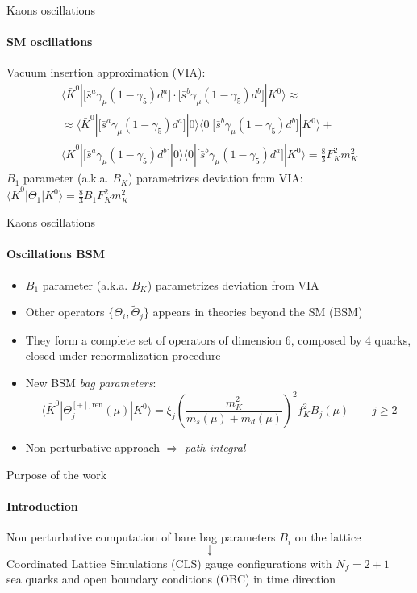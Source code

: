 \documentclass{beamer}
\newcommand{\la}{\langle}
\newcommand{\ra}{\rangle}
\begin{document}
\begin{frame}{Kaons oscillations}
      \framesubtitle{SM oscillations}
      Vacuum insertion approximation (VIA):
      \begin{equation*}
            \begin{gathered}
                  \la \bar K^0 | \Big[ \bar s^a \gamma_\mu (1-\gamma_5) d^a \Big] \cdot \Big[ \bar s^b \gamma_\mu (1-\gamma_5) d^b \Big] | K^0 \ra \approx \\
                  \approx \la \bar K^0 | \Big[ \bar s^a \gamma_\mu (1-\gamma_5) d^a \Big] | 0 \ra \la 0 | \Big[ \bar s^b \gamma_\mu (1-\gamma_5) d^b \Big] | K^0 \ra + \\
                  \la \bar K^0 | \Big[ \bar s^a \gamma_\mu (1-\gamma_5) d^b \Big] | 0 \ra \la 0 | \Big[ \bar s^b \gamma_\mu (1-\gamma_5) d^a \Big] | K^0 \ra = \frac{8}{3} F_K^2 m_K^2
            \end{gathered}
      \end{equation*}
      $B_1$ parameter (a.k.a. $B_K$) parametrizes deviation from VIA: $\la \bar K^0 | \Theta_1 | K^0 \ra = \frac{8}{3} B_1 F_K^2 m_K^2$
\end{frame}

\begin{frame}[fragile]{Kaons oscillations}
      \framesubtitle{Oscillations BSM}
      \begin{itemize}
            \item $B_1$ parameter (a.k.a. $B_K$) parametrizes deviation from VIA
            \item Other operators $\{\Theta_i,\tilde\Theta_j\}$ appears in theories beyond the SM (BSM)
            \item They form a complete set of operators of dimension 6, composed by 4 quarks, closed under renormalization procedure
            \item New BSM \emph{bag parameters}:
            \begin{equation*}
                  \la \bar K^0 | \Theta_j^{[+],\text{ren}} (\mu) | K^0 \ra = \xi_j \left(\frac{m_K^2}{m_s(\mu)+m_d(\mu)}\right)^2 f_K^2 B_j(\mu) \qquad j \ge 2
            \end{equation*}
            \item Non perturbative approach $\Longrightarrow$ \emph{path integral}
      \end{itemize}
\end{frame}

\begin{frame}{Purpose of the work}
      \framesubtitle{Introduction}
      \centering
      Non perturbative computation of bare bag parameters $B_i$ on the lattice
      $$\downarrow$$
      Coordinated Lattice Simulations (CLS) gauge configurations with $N_f = 2+1 $\\ sea quarks and open boundary conditions (OBC) in time direction
\end{frame}
\end{document}
